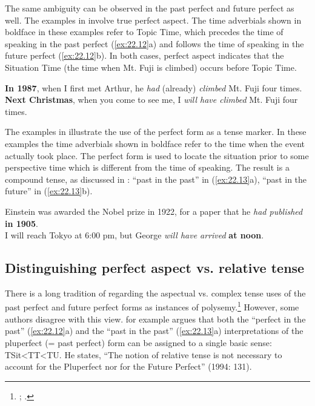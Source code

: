 The same ambiguity can be observed in the past perfect and future perfect as well. The examples in  involve true perfect aspect. The time adverbials shown in boldface in these examples refer to Topic Time, which precedes the time of speaking in the past perfect (\ref{ex:22.12}a) and follows the time of speaking in the future perfect (\ref{ex:22.12}b). In both cases, perfect aspect indicates that the Situation Time (the time when Mt. Fuji is climbed) occurs before Topic Time.


\ea \label{ex:22.12}
\ea \textbf{In 1987}, when I first met Arthur, he \textit{had} (already) \textit{climbed} Mt. Fuji four times.\\
\ex \textbf{Next Christmas}, when you come to see me, I \textit{will have climbed} Mt. Fuji four times.
                       \z
\z


The examples in  illustrate the use of the perfect form as a tense marker. In these examples the time adverbials shown in boldface refer to the time when the event actually took place. The perfect form is used to locate the situation prior to some perspective time which is different from the time of speaking. The result is a compound tense, as discussed in : “past in the past” in (\ref{ex:22.13}a), “past in the future” in (\ref{ex:22.13}b).


\ea \label{ex:22.13}
\ea Einstein was awarded the Nobel prize in 1922, for a paper that he \textit{had published} \textbf{in 1905}.\\
\ex I will reach Tokyo at 6:00 pm, but George \textit{will have arrived} \textbf{at noon}.
                       \z
\z

\subsection{Distinguishing perfect aspect vs. relative tense}\label{sec:22.3.2}

There is a long tradition of regarding the aspectual vs. complex tense uses of the past perfect and future perfect forms as instances of polysemy.\footnote{\citet{Jespersen1924}; \citet{Comrie1976}.} However, some authors disagree with this view. \citet{Klein1994} for example argues that both the “perfect in the past” (\ref{ex:22.12}a) and the “past in the past” (\ref{ex:22.13}a) interpretations of the pluperfect (= past perfect) form can be assigned to a single basic sense: TSit<TT<TU. He states, “The notion of relative tense is not necessary to account for the Pluperfect nor for the Future Perfect” (1994: 131).




